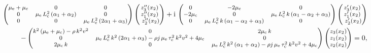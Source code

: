 \documentclass[10pt]{article}
\begin{document}
 \begin{align}
\begin{footnotesize}\begin{pmatrix} \mu_{\rm e} +\mu_{\rm c} &0	&0
 	\\
 	0& {\mu_{\rm e}\,L_{\rm c}^2}\,(\alpha_1+\alpha_2) 
 	&0
 	\\0
 	& 0 & {\mu_{\rm e}\,L_{\rm c}^2}\,(2\alpha_1+\alpha_3) \end{pmatrix}\end{footnotesize}\begin{footnotesize}\begin{pmatrix}	z_3''(x_2)
 	\\
 	z_1''(x_2)
 	\\\	z_2''(x_2)
 	\end{pmatrix}\end{footnotesize}+ {\rm i}\, \begin{footnotesize}\begin{pmatrix} 0& -2\mu_{\rm c} & 0  
 	\\
 	-2\mu_{\rm c} & 0 
 	& {\mu_{\rm e}\,L_{\rm c}^2}\,k\,(\alpha_1-\alpha_2+\alpha_3)
 	\\ 0  
 	& {\mu_{\rm e}\,L_{\rm c}^2}\,k\,(\alpha_1-\alpha_2+\alpha_3) & 0 \end{pmatrix}\end{footnotesize}\begin{footnotesize}\begin{pmatrix} 	z_3'(x_2)
 	\\
 	z_1'(x_2)
 	\\\	z_2'(x_2)
 	\end{pmatrix}\end{footnotesize}\notag\vspace{2mm}\\ -\begin{footnotesize}\begin{pmatrix} k^2\,(\mu_{\rm e} +\mu_{\rm c} )-\rho \,k^2v^2 & 0 & 2\mu_{\rm c}\,k
 	\\
 	0 & {\mu_{\rm e}\,L_{\rm c}^2}\,k^2\,(2\alpha_1+\alpha_3)-\rho j\,\mu_{\rm e}\,\tau_{\rm c}^2\, k^2v^2+4 \mu_{\rm c}
 	& 0
 	\\2\mu_{\rm c}\,k
 	& 0 & {\mu_{\rm e}\,L_{\rm c}^2}\,k^2\,(\alpha_1+\alpha_2)-\rho j\,\mu_{\rm e}\,\tau_{\rm c}^2\, k^2v^2+4 \mu_{\rm c} \end{pmatrix}\end{footnotesize}\begin{footnotesize}\begin{pmatrix} 	z_3(x_2)
 	\\
 	z_1(x_2)
 	\\	z_2(x_2)
 	\end{pmatrix}\end{footnotesize}=0,
 \end{align}
\end{document}
